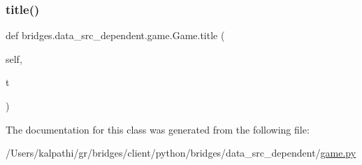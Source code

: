 \mbox{\label{classbridges_1_1data__src__dependent_1_1game_1_1_game_ae2b0f2f1bbbf2d11c669079b075c6ad1}} 
\subsubsection{\texorpdfstring{title()}{title()}\hspace{0.1cm}{\footnotesize\ttfamily [2/2]}}
{\footnotesize\ttfamily def bridges.\+data\+\_\+src\+\_\+dependent.\+game.\+Game.\+title (\begin{DoxyParamCaption}\item[{}]{self,  }\item[{}]{t }\end{DoxyParamCaption})}



The documentation for this class was generated from the following file\+:\begin{DoxyCompactItemize}
\item 
/\+Users/kalpathi/gr/bridges/client/python/bridges/data\+\_\+src\+\_\+dependent/\mbox{\hyperlink{game_8py}{game.\+py}}\end{DoxyCompactItemize}
